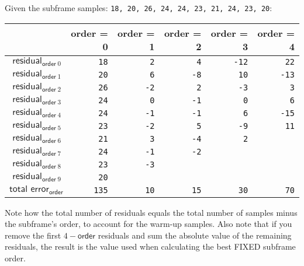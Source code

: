 Given the subframe samples: \texttt{18, 20, 26, 24, 24, 23, 21, 24, 23, 20}:
\begin{table}[h]
\begin{tabular}{r|r|r|r|r|r}
& \textsf{order} = 0 & \textsf{order} = 1 & \textsf{order} = 2 & \textsf{order} = 3 & \textsf{order} = 4 \\
\hline
$\textsf{residual}_{\textsf{order}~0}$ & \texttt{\color{gray}18} & \texttt{\color{gray}2} & \texttt{\color{gray}4} & \texttt{\color{gray}-12} & \texttt{22} \\
$\textsf{residual}_{\textsf{order}~1}$ & \texttt{\color{gray}20} & \texttt{\color{gray}6} & \texttt{\color{gray}-8} & \texttt{10} & \texttt{-13} \\
$\textsf{residual}_{\textsf{order}~2}$ & \texttt{\color{gray}26} & \texttt{\color{gray}-2} & \texttt{2} & \texttt{-3} & \texttt{3} \\
$\textsf{residual}_{\textsf{order}~3}$ & \texttt{\color{gray}24} & \texttt{0} & \texttt{-1} & \texttt{0} & \texttt{6} \\
$\textsf{residual}_{\textsf{order}~4}$ & \texttt{24} & \texttt{-1} & \texttt{-1} & \texttt{6} & \texttt{-15} \\
$\textsf{residual}_{\textsf{order}~5}$ & \texttt{23} & \texttt{-2} & \texttt{5} & \texttt{-9} & \texttt{11} \\
$\textsf{residual}_{\textsf{order}~6}$ & \texttt{21} & \texttt{3} & \texttt{-4} & \texttt{2} \\
$\textsf{residual}_{\textsf{order}~7}$ & \texttt{24} & \texttt{-1} & \texttt{-2} \\
$\textsf{residual}_{\textsf{order}~8}$ & \texttt{23} & \texttt{-3} \\
$\textsf{residual}_{\textsf{order}~9}$ & \texttt{20} \\
\hline
$\textsf{total error}_{\textsf{order}}$ & \texttt{135} & \texttt{10} & \texttt{15} & \texttt{30} & \texttt{70} \\
\end{tabular}
\end{table}
\par
\noindent
Note how the total number of residuals equals the
total number of samples minus the subframe's order,
to account for the warm-up samples.
Also note that if you remove the first $4 - \textsf{order}$ residuals
and sum the absolute value of the remaining residuals,
the result is the  value
used when calculating the best FIXED subframe order.

\clearpage

